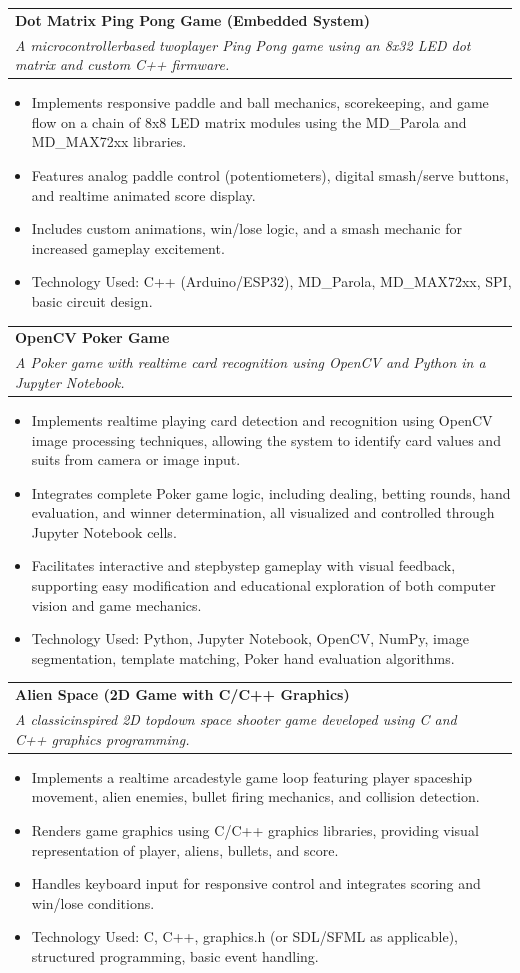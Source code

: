 \documentclass[a4paper,11pt]{article}
\makeatletter
\newcommand{\resumeProject}[4]{
\vspace{0.5mm}\item
    \begin{tabular*}{0.98\textwidth}[t]{l@{\extracolsep{\fill}}r}
        \textbf{#1} & \textit{\footnotesize{#3}} \\
        \footnotesize{\textit{#2}} & \footnotesize{#4}
    \end{tabular*}
    \vspace{-2.4mm}
    \par
}
\newcommand{\resumeItemListStart}{\begin{justify}\begin{itemize}[leftmargin=3ex, rightmargin=2ex, noitemsep,labelsep=1.2mm,itemsep=0mm]\small}
\newcommand{\resumeItemListEnd}{\end{itemize}\end{justify}\vspace{-2mm}}
\makeatother
\begin{document}
\resumeProject
{Dot Matrix Ping Pong Game (Embedded System)} %
{A microcontroller\-based two\-player Ping Pong game using an 8x32 LED dot matrix and custom C++ firmware.} %
{} %
{}
\resumeItemListStart
\item {Implements responsive paddle and ball mechanics, scorekeeping, and game flow on a chain of 8x8 LED matrix modules using the MD\_Parola and MD\_MAX72xx libraries.}
\item {Features analog paddle control (potentiometers), digital smash/serve buttons, and real\-time animated score display.}
\item {Includes custom animations, win/lose logic, and a smash mechanic for increased gameplay excitement.}
\item {Technology Used: C++ (Arduino/ESP32), MD\_Parola, MD\_MAX72xx, SPI, basic circuit design.}
\resumeItemListEnd
\vspace{-2mm}

\resumeProject
{OpenCV Poker Game} %
{A Poker game with real\-time card recognition using OpenCV and Python in a Jupyter Notebook.} %
{} %
{}
\resumeItemListStart
\item {Implements real\-time playing card detection and recognition using OpenCV image processing techniques, allowing the system to identify card values and suits from camera or image input.}
\item {Integrates complete Poker game logic, including dealing, betting rounds, hand evaluation, and winner determination, all visualized and controlled through Jupyter Notebook cells.}
\item {Facilitates interactive and step\-by\-step gameplay with visual feedback, supporting easy modification and educational exploration of both computer vision and game mechanics.}
\item {Technology Used: Python, Jupyter Notebook, OpenCV, NumPy, image segmentation, template matching, Poker hand evaluation algorithms.}
\resumeItemListEnd

\clearpage
\resumeProject
{Alien Space (2D Game with C/C++ Graphics)} %
{A classic\-inspired 2D top\-down space shooter game developed using C and C++ graphics programming.} %
{} %
{}
\resumeItemListStart
\item {Implements a real\-time arcade\-style game loop featuring player spaceship movement, alien enemies, bullet firing mechanics, and collision detection.}
\item {Renders game graphics using C/C++ graphics libraries, providing visual representation of player, aliens, bullets, and score.}
\item {Handles keyboard input for responsive control and integrates scoring and win/lose conditions.}
\item {Technology Used: C, C++, graphics.h (or SDL/SFML as applicable), structured programming, basic event handling.}
\resumeItemListEnd
\vspace{-2mm}
\end{document}
